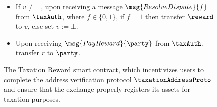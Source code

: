 \begin{figure}[h]
\begin{mdframed}
\begin{itemize}
        \item If $v \neq \bot$, upon receiving a message $\msg{ResolveDispute}{f}$ from
            $\taxAuth$, where $f \in \{0, 1\}$, if $f = 1$ then transfer
            $\reward$ to $v$, else set $v := \bot$.

        \item Upon receiving $\msg{PayReward}{\party}$ from $\taxAuth$,
            transfer $r$ to $\party$.
    \end{itemize}

\end{mdframed}
\caption{
    The Taxation Reward smart contract, which incentivizes users to complete the
    address verification protocol $\taxationAddressProto$ and ensure that the
    exchange properly registers its assets for taxation purposes.
}
\label{fig:reward_contract}
\end{figure}
